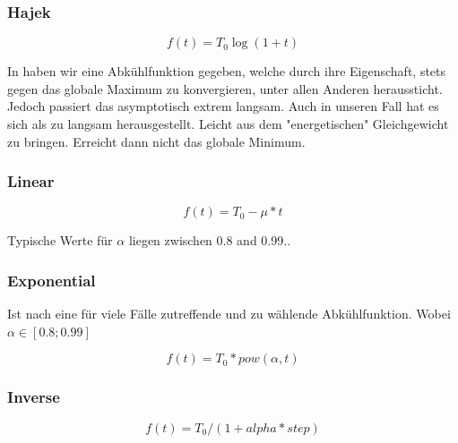 \subsubsection{Hajek}

\begin{equation}\label{eq:Hajek}
    f(t) = T_0\log(1+t)
\end{equation}

In \cite{hajek1988cooling} haben wir eine Abkühlfunktion gegeben, welche durch ihre Eigenschaft,
stets gegen das globale Maximum zu konvergieren, unter allen Anderen heraussticht.
Jedoch passiert das asymptotisch extrem langsam. Auch in unseren Fall hat 
es sich als zu langsam herausgestellt.
Leicht aus dem "energetischen" Gleichgewicht zu bringen. Erreicht dann nicht 
das globale Minimum.

\subsubsection{Linear}

\begin{equation}\label{eq:lineare Abkühlung}
    f(t) = T_0 - \mu*t
\end{equation}

Typische Werte für $\alpha$ liegen zwischen 0.8 and 0.99.\cite{Kirkpatrick671}.

\subsubsection{Exponential}
Ist nach \cite{Kirkpatrick671} eine für viele Fälle zutreffende und zu wählende Abkühlfunktion.
Wobei $\alpha \in [0.8; 0.99]$

\begin{equation}\label{eq:Exponential}
    f(t) = T_0*pow(\alpha,t)
\end{equation}

\subsubsection{Inverse}
\begin{equation}\label{eq:Inverse}
    f(t) = T_0 / (1 + alpha * step)
\end{equation}

